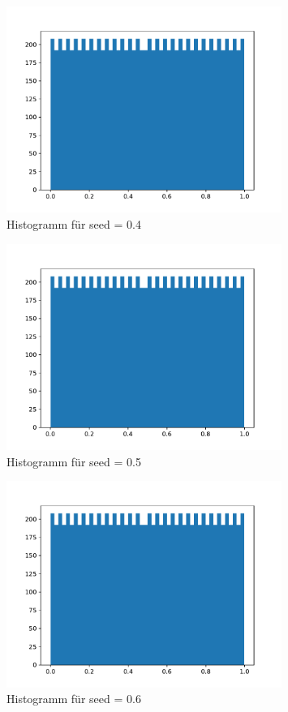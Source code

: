 \begin{figure}[H]
  \centering
  \includegraphics[width=0.8\textwidth]{nr8_c_seed=0.4.pdf}
  \caption{Histogramm für seed = 0.4}
\end{figure}

\begin{figure}[H]
  \centering
  \includegraphics[width=0.8\textwidth]{nr8_c_seed=0.5.pdf}
  \caption{Histogramm für seed = 0.5}
\end{figure}

\begin{figure}[H]
  \centering
  \includegraphics[width=0.8\textwidth]{nr8_c_seed=0.6.pdf}
  \caption{Histogramm für seed = 0.6}
\end{figure}

